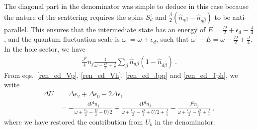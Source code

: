 \documentclass{iopart}
\begin{document}
The diagonal part in the denominator was simple to deduce in this case because the nature of the scattering requires the spins \(S_d^z\) and \(\frac{\beta}{2}\left(\hat n_{q\beta} - \hat n_{q \overline\beta}\right)\) to be anti-parallel. This ensures that the intermediate state has an energy of \(E = \frac{D}{2} + \epsilon_d - \frac{J}{4}\), and the quantum fluctuation scale is \(\omega^\prime = \omega + \epsilon_d\), such that \(\omega^\prime - E = \omega - \frac{D}{2} + \frac{J}{4}\). In the hole sector, we have
\begin{eqnarray}
	\label{ren_ed_Jph}
	\frac{J^2}{4} n_j\frac{1}{\omega - \frac{D}{2} + \frac{J}{4}} \sum_{\beta}\hat n_{d\beta}\left( 1 - \hat n_{d\overline\beta} \right)~.
\end{eqnarray}
From eqs.~\eqref{ren_ed_Vp}, \eqref{ren_ed_Vh}, \eqref{ren_ed_Jpp} and \eqref{ren_ed_Jph}, we write
\begin{eqnarray}
	\Delta U &= \Delta \epsilon_2 + \Delta \epsilon_0 - 2\Delta \epsilon_1 \nonumber\\
		 &= -\frac{4V^2 n_j}{\omega + \frac{U_b}{2} - \frac{D}{2} - U/2} + \frac{4V^2 n_j}{\omega + \frac{U_b}{2} - \frac{D}{2} + U/2 + \frac{J}{4}} - \frac{J^2n_j}{\omega + \frac{U_b}{2} - \frac{D}{2} + \frac{J}{4}}~,
\end{eqnarray}
where we have restored the contribution from \(U_b\) in the denominator.
\end{document}
